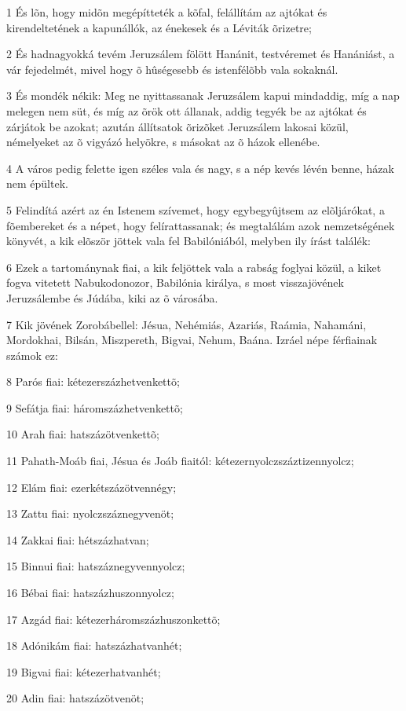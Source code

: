 \par 1 És lõn, hogy midõn megépítteték a kõfal, felállítám az ajtókat és kirendeltetének a kapunállók, az énekesek és a Léviták õrizetre;
\par 2 És hadnagyokká tevém Jeruzsálem fölött Hanánit, testvéremet és Hanániást, a vár fejedelmét, mivel hogy õ hûségesebb és istenfélõbb vala sokaknál.
\par 3 És mondék nékik: Meg ne nyittassanak Jeruzsálem kapui mindaddig, míg a nap melegen nem süt, és míg az õrök ott állanak, addig tegyék be az ajtókat és zárjátok be azokat; azután állítsatok õrizõket Jeruzsálem lakosai közül, némelyeket az õ vigyázó helyökre, s másokat az õ házok ellenébe.
\par 4 A város pedig felette igen széles vala és nagy, s a nép kevés lévén benne, házak nem épültek.
\par 5 Felindítá azért az én Istenem szívemet, hogy egybegyûjtsem az elõljárókat, a fõembereket és a népet, hogy felírattassanak; és megtalálám azok nemzetségének könyvét, a kik elõször jöttek vala fel Babilóniából, melyben ily írást találék:
\par 6 Ezek a tartománynak fiai, a kik feljöttek vala a rabság foglyai közül, a kiket fogva vitetett Nabukodonozor, Babilónia királya, s most visszajövének Jeruzsálembe és Júdába, kiki az õ városába.
\par 7 Kik jövének Zorobábellel: Jésua, Nehémiás, Azariás, Raámia, Nahamáni, Mordokhai, Bilsán, Miszpereth, Bigvai, Nehum, Baána. Izráel népe férfiainak számok ez:
\par 8 Parós fiai: kétezerszázhetvenkettõ;
\par 9 Sefátja fiai: háromszázhetvenkettõ;
\par 10 Arah fiai: hatszázötvenkettõ;
\par 11 Pahath-Moáb fiai, Jésua és Joáb fiaitól: kétezernyolczszáztizennyolcz;
\par 12 Elám fiai: ezerkétszázötvennégy;
\par 13 Zattu fiai: nyolczszáznegyvenöt;
\par 14 Zakkai fiai: hétszázhatvan;
\par 15 Binnui fiai: hatszáznegyvennyolcz;
\par 16 Bébai fiai: hatszázhuszonnyolcz;
\par 17 Azgád fiai: kétezerháromszázhuszonkettõ;
\par 18 Adónikám fiai: hatszázhatvanhét;
\par 19 Bigvai fiai: kétezerhatvanhét;
\par 20 Adin fiai: hatszázötvenöt;
